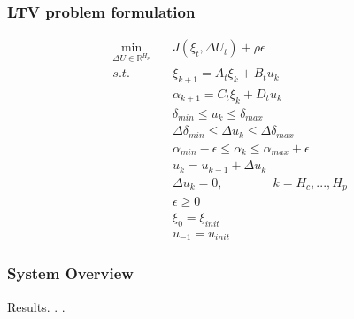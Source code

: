 \documentclass{beamer}
\begin{document}
\begin{frame}
\frametitle{LTV problem formulation }

\begin{align*}
\min_{\Delta U \in \mathbb{R}^{H_p}} \quad &J(\xi_t, \Delta U_t) + \rho \epsilon \\
s.t. \qquad &\xi_{k+1} = A_t \xi_k + B_t u_k \\
&\alpha_{k+1} = C_t \xi_k + D_t u_k \\
&\delta_{min} \leq u_k \leq \delta_{max} \\ 
&\Delta \delta_{min} \leq \Delta u_k \leq \Delta \delta_{max} \\
&\alpha_{min} - \epsilon \leq \alpha_k \leq \alpha_{max} + \epsilon \\
&u_k = u_{k-1} + \Delta u_k \\
&\Delta u_k = 0, \qquad \qquad k = H_c, . . . , H_p \\
&\epsilon \geq 0 \\
&\xi_0 = \xi_{init} \\
& u_{-1} = u_{init}
\end{align*}

\end{frame}







\begin{frame}
\frametitle{System Overview}
Results. . .

\end{frame}


% 
% 
\end{document}
